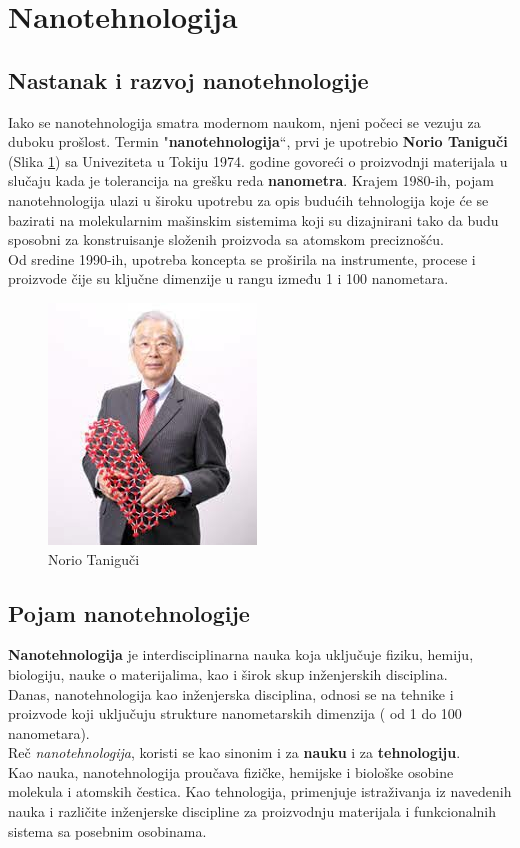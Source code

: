 \documentclass[a4paper]{article}
\begin{document}
\section{Nanotehnologija}

\subsection{Nastanak i razvoj nanotehnologije}
\sloppy Iako se nanotehnologija smatra modernom naukom, njeni počeci se vezuju za duboku prošlost.
Termin "\textbf{nanotehnologija}“, prvi je upotrebio \textbf{Norio Taniguči} (Slika \ref{slika_Norio}) sa Univeziteta u Tokiju 1974. godine govoreći o proizvodnji materijala u slučaju kada je tolerancija na grešku reda \textbf{nanometra}.
Krajem 1980-ih, pojam nanotehnologija ulazi u široku upotrebu za opis budućih tehnologija koje će se bazirati na molekularnim mašinskim sistemima koji su dizajnirani tako da budu sposobni za konstruisanje složenih proizvoda sa atomskom preciznošću.\\ 
Od sredine 1990-ih, upotreba koncepta se proširila na instrumente, procese i proizvode čije su ključne dimenzije u rangu između 1 i 100 nanometara.\\

\begin{figure}[H]
    \centering
    \includegraphics[width=.4\textwidth]{slika 1.jpg}
    \caption{Norio Taniguči}
    \label{slika_Norio}
\end{figure}

\subsection{Pojam nanotehnologije}
\textbf{Nanotehnologija} je interdisciplinarna nauka koja uključuje fiziku, hemiju, biologiju, nauke o materijalima, kao i širok skup inženjerskih disciplina.\\ 
Danas, nanotehnologija kao inženjerska disciplina, odnosi se na tehnike i proizvode koji uključuju strukture nanometarskih dimenzija ( od 1 do 100 nanometara).\\  Reč \textit{nanotehnologija}, koristi se kao sinonim i za \textbf{nauku} i za \textbf{tehnologiju}.\\ 
Kao nauka, nanotehnologija proučava fizičke, hemijske i biološke osobine molekula i atomskih čestica. Kao tehnologija, primenjuje istraživanja iz navedenih nauka i različite inženjerske discipline za proizvodnju materijala i funkcionalnih sistema sa posebnim osobinama.
\end{document}
